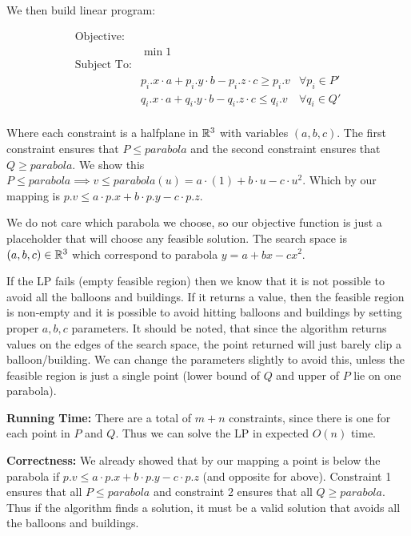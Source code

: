 \documentclass[11pt]{article}
\begin{document}
We then build linear program:

\begin{align*}
  \text{Objective: }\, & & \\
  & \min 1 & \\
  \text{Subject To:} & & \\
  & p_i.x \cdot a + p_i.y \cdot b - p_i.z \cdot c \geq p_i.v & \forall p_i \in P' \\
  & q_i.x \cdot a + q_i.y \cdot b - q_i.z \cdot c \leq q_i.v & \forall q_i \in Q' \\
\end{align*}

Where each constraint is a halfplane in $\mathbb{R}^3$ with variables $(a,b,c)$. 
The first constraint ensures that $P \leq parabola$ and the second constraint ensures 
that $Q \geq parabola$. We show this $P \leq parabola \implies v \leq parabola(u) = a \cdot (1) + b \cdot u - c \cdot u^2$.
Which by our mapping is $p.v \leq a \cdot p.x + b \cdot p.y - c \cdot p.z$.

We do not care which parabola we choose, so our objective function is just a placeholder
that will choose any feasible solution. 
The search space is $(a,b,c) \in \mathbb{R} ^3$ which correspond to parabola $y = a + bx - cx^2$.

If the LP fails (empty feasible region) then we know that it is not possible to avoid all the balloons
and buildings. If it returns a value, then the feasible region is non-empty and it is possible to avoid
hitting balloons and buildings by setting proper $a, b, c$ parameters.
It should be noted, that since the algorithm returns values on the edges of the search space,
the point returned will just barely clip a balloon/building. We can change the parameters slightly
to avoid this, unless the feasible region is just a single point (lower bound of $Q$ and upper of $P$ lie on one parabola).


\textbf{Running Time:} There are a total of $m + n$ constraints, since there is one for each point in $P$ and $Q$.
Thus we can solve the LP in expected $O(n)$ time.

\textbf{Correctness: } We already showed that by our mapping a point is below the parabola
if $p.v \leq a \cdot p.x + b \cdot p.y - c \cdot p.z$ (and opposite for above). 
Constraint 1 ensures that all $P \leq parabola$ and constraint 2 ensures that all $Q \geq parabola$.
Thus if the algorithm finds a solution, it must be a valid solution that avoids all the balloons and buildings.
\end{document}
